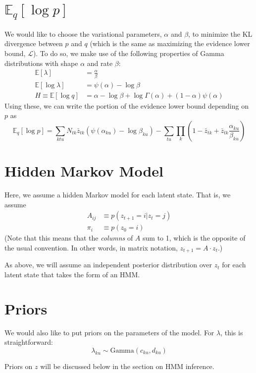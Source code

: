 \documentclass[11pt]{article}
\begin{document}
\section{$\mathbb{E}_q[\log p]$}
We would like to choose the variational parameters, $\alpha$ and $\beta$, to minimize the KL divergence between $p$ and $q$ (which is the same as maximizing the evidence lower bound, $\mathcal{L}$). To do so, we make use of the following properties of Gamma distributions with shape $\alpha$ and rate $\beta$:
\begin{align}
   \mathbb{E}[\lambda] &= \frac{\alpha}{\beta} \\
   \mathbb{E}[\log \lambda] &= \psi(\alpha) - \log \beta \\
   H \equiv \mathbb{E}[\log q] &= \alpha - \log \beta + \log \Gamma(\alpha) + (1 - \alpha)\psi(\alpha) 
\end{align}
Using these, we can write the portion of the evidence lower bound depending on $p$ as 
\begin{equation}
    \mathbb{E}_q[\log p] = \sum_{ktu} N_{tk}\bar{z}_{tk}(\psi(\alpha_{ku}) -\log \beta_{ku}) - \sum_{tu} \prod_k \left( 1 - \bar{z}_{tk} + \bar{z}_{tk} \frac{\alpha_{ku}}{\beta_{ku}}\right)
\end{equation}

\section{Hidden Markov Model}
Here, we assume a hidden Markov model for each latent state. That is, we assume
\begin{align}
    A_{ij} &\equiv p(z_{t+1}=i|z_t = j) \\
    \pi_i &\equiv p(z_0 = i)
\end{align}
(Note that this means that the \emph{columns} of $A$ sum to 1, which is the opposite of the usual convention. In other words, in matrix notation, $z_{t+1} = A \cdot z_t$.)

As above, we will assume an independent posterior distribution over $z_t$ for each latent state that takes the form of an HMM. 

\section{Priors}
We would also like to put priors on the parameters of the model. For $\lambda$, this is straightforward:
\begin{equation}
    \lambda_{ku} \sim \mathrm{Gamma}(c_{ku}, d_{ku})
\end{equation}

Priors on $z$ will be discussed below in the section on HMM inference.
\end{document}
